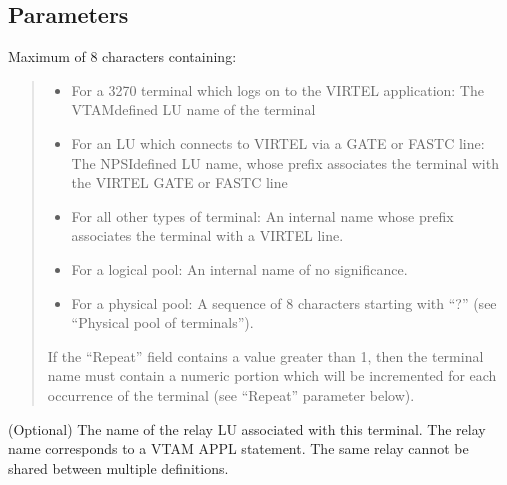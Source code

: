 \documentclass[letterpaper,10pt,english]{sphinxmanual}
\begin{document}
\subsection{Parameters}
\label{\detokenize{connectivity_guide:index-103}}\label{\detokenize{connectivity_guide:id55}}\begin{description}
\sphinxAtStartPar
Maximum of 8 characters containing:
\begin{quote}
\begin{itemize}
\item {} 
\sphinxAtStartPar
For a 3270 terminal which logs on to the VIRTEL application: The VTAM\sphinxhyphen{}defined LU name of the terminal

\item {} 
\sphinxAtStartPar
For an LU which connects to VIRTEL via a GATE or FASTC line: The NPSI\sphinxhyphen{}defined LU name, whose prefix associates the terminal with the VIRTEL GATE or FASTC line

\item {} 
\sphinxAtStartPar
For all other types of terminal: An internal name whose prefix associates the terminal with a VIRTEL line.

\item {} 
\sphinxAtStartPar
For a logical pool: An internal name of no significance.

\item {} 
\sphinxAtStartPar
For a physical pool: A sequence of 8 characters starting with “?” (see “Physical pool of terminals”).

\end{itemize}

\sphinxAtStartPar
If the “Repeat” field contains a value greater than 1, then the terminal name must contain a numeric portion which will be incremented for each occurrence of the terminal (see “Repeat” parameter below).
\end{quote}

\sphinxAtStartPar
(Optional) The name of the relay LU associated with this terminal. The relay name corresponds to a VTAM APPL statement. The same relay cannot be shared between multiple definitions.


\end{description}
\end{document}
